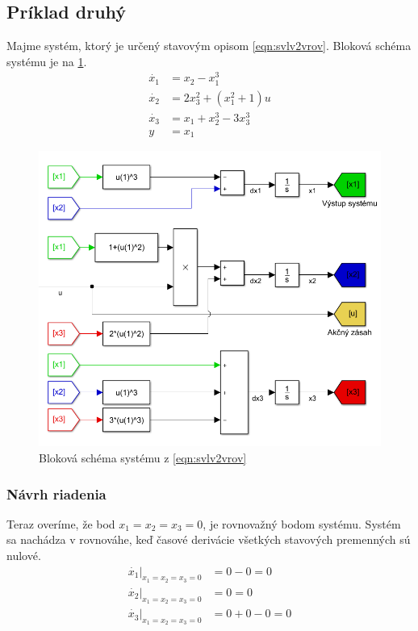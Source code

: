 \documentclass[../main.tex]{subfiles}
\begin{document}
	\subsection{Príklad druhý}
	Majme systém, ktorý je určený stavovým opisom \cref{eqn:svlv2vrov}. Bloková schéma systému je na \cref{fig:svlvv2schfig}.
	\begin{equation}
		\begin{aligned}
		\dot{x_1} &= x_2 - x_1^3\\
		\dot{x_2} &= 2x_3^2 + (x_1^2+1)u \\
		\dot{x_3} &= x_1 + x_2^3 - 3x_3^3 \\
		y &= x_1
		\end{aligned}
		\label{eqn:svlv2vrov}
	\end{equation}
	\begin{figure}[h!]
		\centering
		\includegraphics[width=0.8\linewidth]{sysPr2}
		\caption{Bloková schéma systému z \cref{eqn:svlv2vrov}}
		\label{fig:svlvv2schfig}
	\end{figure}
	\subsubsection{Návrh riadenia}
	Teraz overíme, že bod  $x_1 = x_2 = x_3 = 0 $, je rovnovažný bodom systému. Systém sa nachádza v rovnováhe, keď časové derivácie všetkých stavových premenných sú nulové. 
	\begin{equation}
		\begin{aligned}
		\dot{x_1}|_{x_1 = x_2 = x_3 = 0} &= 0 - 0 = 0 \\
		\dot{x_2}|_{x_1 = x_2 = x_3 = 0} &= 0    = 0 \\
		\dot{x_3}|_{x_1 = x_2 = x_3 = 0} &= 0 + 0 - 0 = 0 \\
		\end{aligned}
		\label{eqn:svlvvPr2OvereniePB}
	\end{equation}
	
\end{document}
